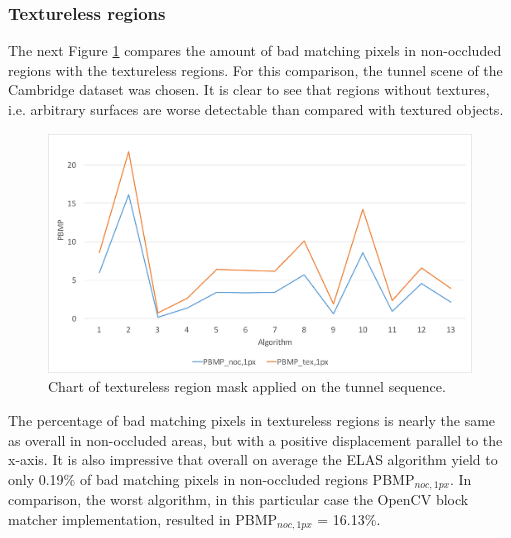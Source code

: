 \subsubsection{Textureless regions}

\noindent The next Figure \ref{fig:eval-plots-pbmp-tex1} compares the amount of bad matching pixels in non-occluded regions with the textureless regions.
For this comparison, the tunnel scene of the Cambridge dataset was chosen.
It is clear to see that regions without textures, i.e. arbitrary surfaces are worse detectable than compared with textured objects.

\begin{figure}[h!]
\centering
\includegraphics[width=1.0\textwidth]{src/images/evaluation/plots/05-tunnel-pbmp-tex-1.pdf}
\caption[Chart of textureless region mask]{Chart of textureless region mask applied on the tunnel sequence.}
\label{fig:eval-plots-pbmp-tex1}
\end{figure}

\noindent The percentage of bad matching pixels in textureless regions is nearly the same as overall in non-occluded areas, but with a positive displacement parallel to the x-axis.
It is also impressive that overall on average the ELAS algorithm yield to only 0.19\% of bad matching pixels in non-occluded regions PBMP$_{noc,1px}$.
In comparison, the worst algorithm, in this particular case the OpenCV block matcher implementation, resulted in PBMP$_{noc,1px}$ = 16.13\%.

